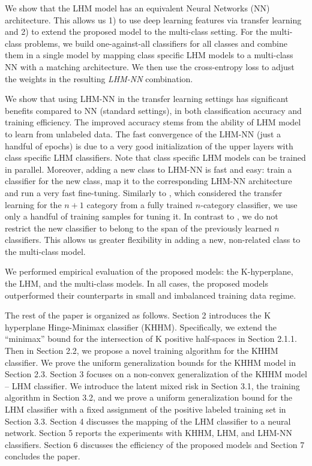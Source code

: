 \documentclass[twoside,11pt]{article}
\begin{document}
We show that the LHM model has an equivalent Neural Networks (NN) architecture. This allows us 1) to use deep learning features via transfer learning and 2) to extend the proposed model to the multi-class setting. For the multi-class problems, we build one-against-all classifiers for all classes and combine them in a single model by mapping class specific LHM models to a multi-class NN with a matching architecture. We then use the cross-entropy loss to adjust the weights in the resulting \emph{LHM-NN} combination.

We show that using LHM-NN in the transfer learning settings has significant benefits compared to NN (standard settings), in both classification accuracy and training efficiency. The improved accuracy stems from the ability of LHM model to learn from unlabeled data. The fast convergence of the LHM-NN (just a handful of epochs) is due to a very good initialization of the upper layers with class specific LHM classifiers. Note that class specific LHM models can be trained in parallel. Moreover, adding a new class to LHM-NN is fast and easy: train a classifier for the new class, map it to the corresponding LHM-NN architecture and run a very fast fine-tuning. Similarly to \cite{fromNtoN+1}, which considered the transfer learning for the $n+1$ category from a fully trained $n$-category classifier, we use only a handful of training samples for tuning it. In contrast to \cite{fromNtoN+1}, we do not restrict the new classifier to belong to the span of the previously learned $n$ classifiers. This allows us greater flexibility in adding a new, non-related class to the multi-class model.


We performed empirical evaluation of the proposed models: the K-hyperplane, the LHM, and the multi-class models. In all cases, the proposed models outperformed their counterparts in small and imbalanced training data regime.

The rest of the paper is organized as follows.
Section 2 introduces the  K hyperplane Hinge-Minimax classifier (KHHM). Specifically, we extend the  ``minimax'' bound for the intersection of K positive half-spaces in Section 2.1.1. Then in Section 2.2, we propose a novel training algorithm for the KHHM classifier. We prove the uniform generalization bounds for the KHHM model in Section 2.3.  Section 3 focuses on a non-convex generalization of the KHHM model -- LHM classifier. We introduce the latent mixed risk in Section 3.1, the training algorithm in Section 3.2, and we prove a uniform generalization bound for the LHM classifier with a fixed assignment of the positive labeled training set in Section 3.3. Section 4 discusses the mapping of the LHM classifier to a neural network. Section 5 reports the experiments with KHHM, LHM, and LHM-NN classifiers. Section 6 discusses the efficiency of the proposed models and Section 7 concludes the paper.
\end{document}
